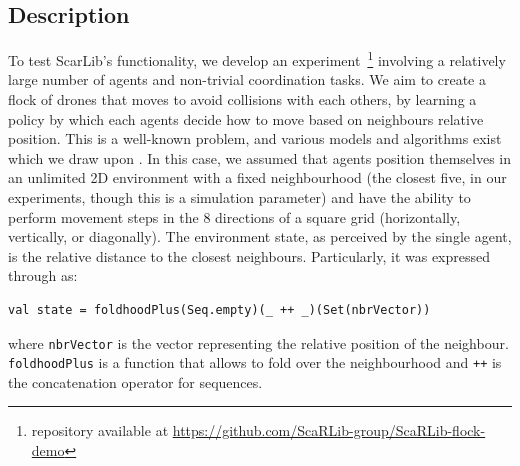 \subsection{Description}
To test ScarLib's functionality, 
 we develop an experiment~\footnote{repository available at \url{https://github.com/ScaRLib-group/ScaRLib-flock-demo}}
 involving a relatively large number of agents 
 and non-trivial coordination tasks. 
% 
We aim to create a flock of drones 
 that moves to avoid collisions with each others, by learning a policy by which each 
 agents decide how to move based on neighbours relative position.
% 
This is a well-known problem, and various models and algorithms exist which we draw upon \cite{DBLP:conf/siggraph/Reynolds87,inverserl}. %
%
In this case, %
 we assumed that agents position themselves in an unlimited 2D environment 
 with a fixed neighbourhood (the closest five, in our experiments, though this is a simulation parameter)
 and have the ability to perform movement steps in the 8 directions of a square grid (horizontally, vertically, or diagonally).
%
The environment state, as perceived by the single agent, is the relative distance to the closest neighbours.
%
Particularly, it was expressed through \scafi{} as:
\begin{lstlisting}
val state = foldhoodPlus(Seq.empty)(_ ++ _)(Set(nbrVector))
\end{lstlisting}
where \texttt{nbrVector} is the vector representing the relative position of the neighbour.
\lstinline|foldhoodPlus| is a \scafi{} function that allows to fold over the neighbourhood 
 and \lstinline|++| is the concatenation operator for sequences.

